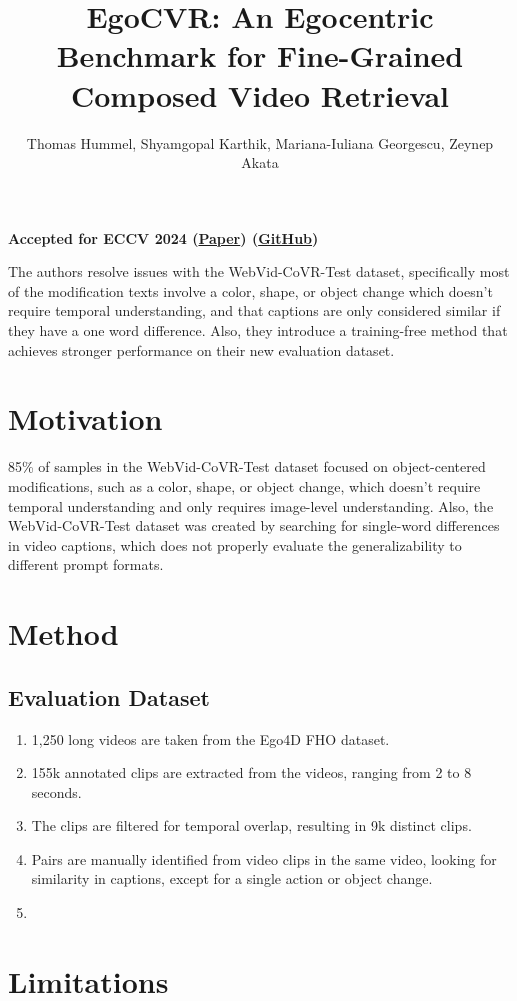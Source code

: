 \documentclass{article}
\title{EgoCVR: An Egocentric Benchmark for Fine-Grained Composed Video Retrieval}
\author{Thomas Hummel, Shyamgopal Karthik, Mariana-Iuliana Georgescu, Zeynep Akata}
\date{}
\begin{document}
\maketitle

\begin{center}\textbf{Accepted for ECCV 2024 (\href{https://arxiv.org/pdf/2407.16658}{Paper}) (\href{https://github.com/ExplainableML/EgoCVR}{GitHub})}\end{center}

The authors resolve issues with the WebVid-CoVR-Test dataset, specifically most of the modification texts involve a color, shape, or object change which doesn't require temporal understanding, and that captions are only considered similar if they have a one word difference. Also, they introduce a training-free method that achieves stronger performance on their new evaluation dataset.

\section*{Motivation}

85\% of samples in the WebVid-CoVR-Test dataset focused on object-centered modifications, such as a color, shape, or object change, which doesn't require temporal understanding and only requires image-level understanding. Also, the WebVid-CoVR-Test dataset was created by searching for single-word differences in video captions, which does not properly evaluate the generalizability to different prompt formats.

\section*{Method}

\subsection*{Evaluation Dataset}
\begin{enumerate}
    \item 1,250 long videos are taken from the Ego4D FHO dataset.
    \item 155k annotated clips are extracted from the videos, ranging from 2 to 8 seconds.
    \item The clips are filtered for temporal overlap, resulting in 9k distinct clips.
    \item Pairs are manually identified from video clips in the same video, looking for similarity in captions, except for a single action or object change.
    \item 
\end{enumerate}

\section*{Limitations}
\end{document}
